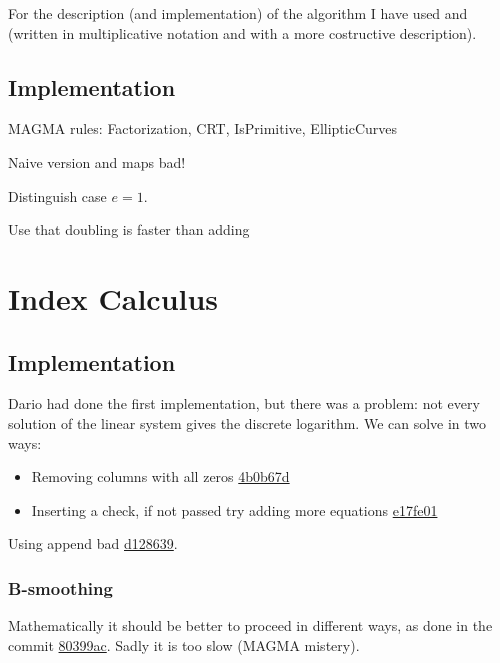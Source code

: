 \documentclass{article}
\theoremstyle{plain}
\theoremstyle{remark}
\theoremstyle{definition}
\begin{document}
For the description (and implementation) of the algorithm I have used \linebreak
\cite[Section 5.2.3]{washington} and \cite[Section 7.2.3]{stinson} (written in multiplicative notation and with a more costructive description). 

\subsection{Implementation}

MAGMA rules: Factorization, CRT, IsPrimitive, EllipticCurves


Naive version and maps bad!


Distinguish case $e = 1$.


Use that doubling is faster than adding 


\section{Index Calculus}

\subsection{Implementation}

Dario had done the first implementation, but there was a problem: not every solution of the linear system gives the discrete logarithm. We can solve in two ways:
\begin{itemize}
	\item Removing columns with all zeros \href{https://github.com/giacomoborin/project2_MAGMA/pull/30/commits/4b0b67d0dcbe51f01058c64a06a1c39fdb5cf56e}{4b0b67d}
	\item Inserting a check, if not passed try adding more equations \href{https://github.com/giacomoborin/project2_MAGMA/pull/30/commits/e17fe016088c6746c46d52d7154922060f8e5366}{e17fe01}
\end{itemize}



Using append bad \href{https://github.com/giacomoborin/project2_MAGMA/commit/d12863968fe66504486fa7fea78929ab2aa98f43}{d128639}. 

\subsubsection{B-smoothing}

Mathematically it should be better to proceed in different ways, as done in the commit \href{https://github.com/giacomoborin/project2_MAGMA/commit/80399ac928cf19e009451f174adc4138283580f2}{80399ac}. Sadly it is too slow (MAGMA mistery).
\end{document}
